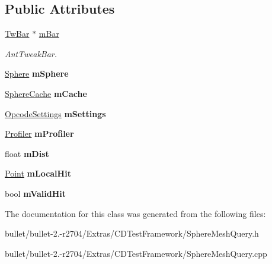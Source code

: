 \subsection*{Public Attributes}
\begin{DoxyCompactItemize}
\item 
\hypertarget{class_sphere_mesh_query_aa2319881efe2a4d5feef8f8e41e443d9}{\hyperlink{struct_c_tw_bar}{Tw\+Bar} $\ast$ \hyperlink{class_sphere_mesh_query_aa2319881efe2a4d5feef8f8e41e443d9}{m\+Bar}}\label{class_sphere_mesh_query_aa2319881efe2a4d5feef8f8e41e443d9}

\begin{DoxyCompactList}\small\item\em Ant\+Tweak\+Bar. \end{DoxyCompactList}\item 
\hypertarget{class_sphere_mesh_query_a9fd6255fccdd5bd3d9cecfb78092cede}{\hyperlink{class_sphere}{Sphere} {\bfseries m\+Sphere}}\label{class_sphere_mesh_query_a9fd6255fccdd5bd3d9cecfb78092cede}

\item 
\hypertarget{class_sphere_mesh_query_a82706ee8744af374e585ca266094715b}{\hyperlink{struct_sphere_cache}{Sphere\+Cache} {\bfseries m\+Cache}}\label{class_sphere_mesh_query_a82706ee8744af374e585ca266094715b}

\item 
\hypertarget{class_sphere_mesh_query_a406f391e9cbdd4867ebf7cbb516bcde5}{\hyperlink{class_opcode_settings}{Opcode\+Settings} {\bfseries m\+Settings}}\label{class_sphere_mesh_query_a406f391e9cbdd4867ebf7cbb516bcde5}

\item 
\hypertarget{class_sphere_mesh_query_a206ce10cd180615cb17512c020b7e674}{\hyperlink{class_profiler}{Profiler} {\bfseries m\+Profiler}}\label{class_sphere_mesh_query_a206ce10cd180615cb17512c020b7e674}

\item 
\hypertarget{class_sphere_mesh_query_a0f6fb37ad90120371980e2753c8548cb}{float {\bfseries m\+Dist}}\label{class_sphere_mesh_query_a0f6fb37ad90120371980e2753c8548cb}

\item 
\hypertarget{class_sphere_mesh_query_ad322b0e561741adf4dd82a0a1a8df4db}{\hyperlink{class_point}{Point} {\bfseries m\+Local\+Hit}}\label{class_sphere_mesh_query_ad322b0e561741adf4dd82a0a1a8df4db}

\item 
\hypertarget{class_sphere_mesh_query_a3051648f9bc8b41d3ad8f3b38f378a50}{bool {\bfseries m\+Valid\+Hit}}\label{class_sphere_mesh_query_a3051648f9bc8b41d3ad8f3b38f378a50}

\end{DoxyCompactItemize}


The documentation for this class was generated from the following files\+:\begin{DoxyCompactItemize}
\item 
bullet/bullet-\/2.-\/r2704/\+Extras/\+C\+D\+Test\+Framework/Sphere\+Mesh\+Query.\+h\item 
bullet/bullet-\/2.-\/r2704/\+Extras/\+C\+D\+Test\+Framework/Sphere\+Mesh\+Query.\+cpp\end{DoxyCompactItemize}
